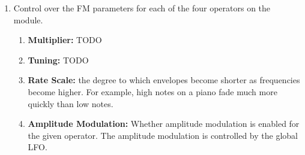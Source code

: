 \documentclass[12pt,a4paper]{article}
\begin{document}
\begin{enumerate}
\begin{enumerate}
  \end{enumerate}
  \item Control over the FM parameters for each of the four operators on the module. \begin{enumerate}
    \item \textbf{Multiplier:} TODO
    \item \textbf{Tuning:} TODO
    \item \textbf{Rate Scale:} the degree to which envelopes become shorter as frequencies become higher. For example, high notes on a piano fade much more quickly than low notes.
    \item \textbf{Amplitude Modulation:} Whether amplitude modulation is enabled for the given operator. The amplitude modulation is controlled by the global LFO.
  \end{enumerate}
\end{enumerate}


\clearpage
\renewcommand\refname{References \& Acknowledgments}
\nocite{*}


\end{document}
